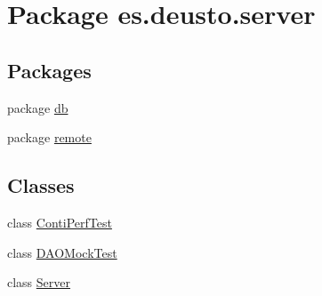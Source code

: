 \hypertarget{namespacees_1_1deusto_1_1server}{}\section{Package es.\+deusto.\+server}
\label{namespacees_1_1deusto_1_1server}
\subsection*{Packages}
\begin{DoxyCompactItemize}
\item 
package \hyperlink{namespacees_1_1deusto_1_1server_1_1db}{db}
\item 
package \hyperlink{namespacees_1_1deusto_1_1server_1_1remote}{remote}
\end{DoxyCompactItemize}
\subsection*{Classes}
\begin{DoxyCompactItemize}
\item 
class \hyperlink{classes_1_1deusto_1_1server_1_1_conti_perf_test}{Conti\+Perf\+Test}
\item 
class \hyperlink{classes_1_1deusto_1_1server_1_1_d_a_o_mock_test}{D\+A\+O\+Mock\+Test}
\item 
class \hyperlink{classes_1_1deusto_1_1server_1_1_server}{Server}
\end{DoxyCompactItemize}
